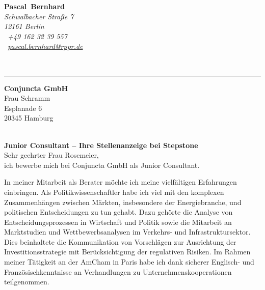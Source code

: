 \documentclass[11pt,a4paper]{article}
\def\firstname{Pascal}
\def\familyname{Bernhard}
\begin{document}
\sffamily   %
\hfill%
\begin{minipage}[t]{.6\textwidth}
	\raggedleft%
	{\bfseries {\color{firstnamecolor}\firstname}~{\color{familynamecolor}\familyname}}\\[.35ex]
	\small\itshape%
	Schwalbacher Straße 7\\
	12161 Berlin\\[.35ex]
	\Mobilefone~+49 162 32 39 557 \\
	\Letter~\href{mailto:pascal.bernhard@rppr.de}{pascal.bernhard@rppr.de}
\end{minipage}\\[0.5em]
%
{\color{firstnamecolor}\rule{\textwidth}{.25ex}}
%
\begin{minipage}[t]{.4\textwidth}
	\raggedright%
	\vspace*{1em}
	\textbf{Conjuncta GmbH} \\
	Frau Schramm \\[.35ex]
	\small%
	Esplanade 6\\
	20345 Hamburg
\end{minipage}
%
\hfill
%
\begin{minipage}[t]{.4\textwidth}
	\raggedleft %
\end{minipage}\\[1em]


{\bfseries \color{familynamecolor}Junior Consultant -- Ihre Stellenanzeige bei Stepstone}\\[0.75em]

Sehr geehrter Frau Rosemeier,\\[0.5em]
%
ich bewerbe mich bei Conjuncta GmbH als Junior Consultant.

In meiner Mitarbeit als Berater möchte ich meine vielfältigen Erfahrungen einbringen. Als Politikwissenschaftler habe ich viel mit den komplexen Zusammen­hängen zwischen Märkten, insbesondere der Energiebranche, und politischen Entscheidungen zu tun gehabt. Dazu gehörte die Analyse von Entscheidungsprozessen in Wirtschaft und Politik sowie die Mitarbeit an Marktstudien und Wettbewerbsanalysen im Verkehrs- und Infrastruktursektor. Dies beinhaltete die Kommunikation von Vorschlägen zur Ausrichtung der Investitionsstrategie mit Berücksichtigung der regulativen Risiken. Im Rahmen meiner Tätigkeit an der AmCham in Paris habe ich dank sicherer Englisch- und Französischkenntnisse an Verhandlungen zu Unternehmenskooperationen teilgenommen. 
\end{document}
